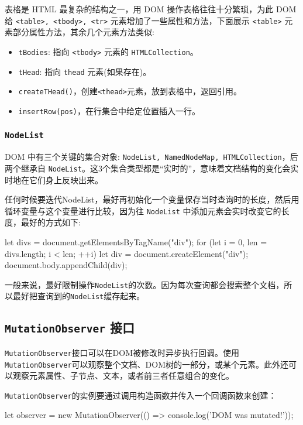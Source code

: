 表格是 HTML 最复杂的结构之一，用 DOM 操作表格往往十分繁琐，为此 DOM 给 \texttt{<table>, <tbody>, <tr>} 元素增加了一些属性和方法，下面展示 \texttt{<table>} 元素部分属性方法，其余几个元素方法类似:
\begin{itemize}
    \item \texttt{tBodies}: 指向 \texttt{<tbody>} 元素的 \texttt{HTMLCollection}。
    \item \texttt{tHead}: 指向 \texttt{thead} 元素(如果存在)。
    \item \texttt{createTHead()}，创建\texttt{<thead>}元素，放到表格中，返回引用。
    \item \texttt{insertRow(pos)}，在行集合中给定位置插入一行。
\end{itemize}

\subsubsection*{\texttt{NodeList}}

DOM 中有三个关键的集合对象: \texttt{NodeList, NamedNodeMap, HTMLCollection}，后两个继承自 \texttt{NodeList}。这3个集合类型都是“实时的”，意味着文档结构的变化会实时地在它们身上反映出来。

任何时候要迭代NodeList，最好再初始化一个变量保存当时查询时的长度，然后用循环变量与这个变量进行比较，因为往 \texttt{NodeList} 中添加元素会实时改变它的长度，最好的方式如下:

\begin{JavaScript}
let divs = document.getElementsByTagName("div");  
for (let i = 0, len = divs.length; i < len; ++i) {   
    let div = document.createElement("div");   
    document.body.appendChild(div); 
}
\end{JavaScript}

一般来说，最好限制操作\texttt{NodeList}的次数。因为每次查询都会搜索整个文档，所以最好把查询到的\texttt{NodeList}缓存起来。

\subsection{\texttt{MutationObserver} 接口}

\texttt{MutationObserver}接口可以在DOM被修改时异步执行回调。使用\texttt{MutationObserver}可以观察整个文档、DOM树的一部分，或某个元素。此外还可以观察元素属性、子节点、文本，或者前三者任意组合的变化。

\texttt{MutationObserver}的实例要通过调用构造函数并传入一个回调函数来创建：

\begin{JavaScript}
let observer = new MutationObserver(() => console.log('DOM was mutated!')); 
\end{JavaScript}

